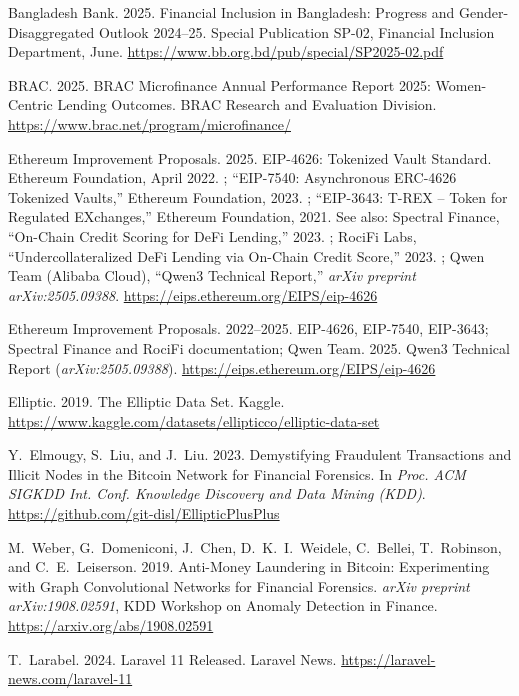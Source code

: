 \documentclass[12pt,a4paper]{report}
\begin{document}
{\begin{enumerate}[label={[\arabic*]}]
\item Bangladesh Bank. 2025. Financial Inclusion in Bangladesh: Progress and Gender-Disaggregated Outlook 2024--25. Special Publication SP-02, Financial Inclusion Department, June. \url{https://www.bb.org.bd/pub/special/SP2025-02.pdf}

\item BRAC. 2025. BRAC Microfinance Annual Performance Report 2025: Women-Centric Lending Outcomes. BRAC Research and Evaluation Division. \url{https://www.brac.net/program/microfinance/}

\item Ethereum Improvement Proposals. 2025. EIP-4626: Tokenized Vault Standard. Ethereum Foundation, April 2022. ; ``EIP-7540: Asynchronous ERC-4626 Tokenized Vaults,'' Ethereum Foundation, 2023. ; ``EIP-3643: T-REX -- Token for Regulated EXchanges,'' Ethereum Foundation, 2021.  See also: Spectral Finance, ``On-Chain Credit Scoring for DeFi Lending,'' 2023. ; RociFi Labs, ``Undercollateralized DeFi Lending via On-Chain Credit Score,'' 2023. ; Qwen Team (Alibaba Cloud), ``Qwen3 Technical Report,'' \emph{arXiv preprint arXiv:2505.09388}. \url{https://eips.ethereum.org/EIPS/eip-4626}

\item Ethereum Improvement Proposals. 2022--2025. EIP-4626, EIP-7540, EIP-3643; Spectral Finance and RociFi documentation; Qwen Team. 2025. Qwen3 Technical Report (\emph{arXiv:2505.09388}). \url{https://eips.ethereum.org/EIPS/eip-4626}

\item Elliptic. 2019. The Elliptic Data Set. Kaggle. \url{https://www.kaggle.com/datasets/ellipticco/elliptic-data-set}

\item Y.~Elmougy, S.~Liu, and J.~Liu. 2023. Demystifying Fraudulent Transactions and Illicit Nodes in the Bitcoin Network for Financial Forensics. In \emph{Proc. ACM SIGKDD Int. Conf. Knowledge Discovery and Data Mining (KDD)}. \url{https://github.com/git-disl/EllipticPlusPlus}

\item M.~Weber, G.~Domeniconi, J.~Chen, D.~K.~I.~Weidele, C.~Bellei, T.~Robinson, and C.~E.~Leiserson. 2019. Anti-Money Laundering in Bitcoin: Experimenting with Graph Convolutional Networks for Financial Forensics. \emph{arXiv preprint arXiv:1908.02591}, KDD Workshop on Anomaly Detection in Finance. \url{https://arxiv.org/abs/1908.02591}

\item T.~Larabel. 2024. Laravel 11 Released. Laravel News. \url{https://laravel-news.com/laravel-11}


\end{enumerate}}
\end{document}
